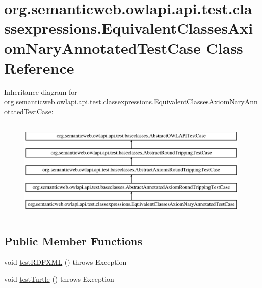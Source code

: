 \hypertarget{classorg_1_1semanticweb_1_1owlapi_1_1api_1_1test_1_1classexpressions_1_1_equivalent_classes_axiom_nary_annotated_test_case}{\section{org.\-semanticweb.\-owlapi.\-api.\-test.\-classexpressions.\-Equivalent\-Classes\-Axiom\-Nary\-Annotated\-Test\-Case Class Reference}
\label{classorg_1_1semanticweb_1_1owlapi_1_1api_1_1test_1_1classexpressions_1_1_equivalent_classes_axiom_nary_annotated_test_case}
}
Inheritance diagram for org.\-semanticweb.\-owlapi.\-api.\-test.\-classexpressions.\-Equivalent\-Classes\-Axiom\-Nary\-Annotated\-Test\-Case\-:\begin{figure}[H]
\begin{center}
\leavevmode
\includegraphics[height=4.861111cm]{classorg_1_1semanticweb_1_1owlapi_1_1api_1_1test_1_1classexpressions_1_1_equivalent_classes_axiom_nary_annotated_test_case}
\end{center}
\end{figure}
\subsection*{Public Member Functions}
\begin{DoxyCompactItemize}
\item 
void \hyperlink{classorg_1_1semanticweb_1_1owlapi_1_1api_1_1test_1_1classexpressions_1_1_equivalent_classes_axiom_nary_annotated_test_case_a8fca9eb75626ce41384815070213ce1d}{test\-R\-D\-F\-X\-M\-L} ()  throws Exception 
\item 
void \hyperlink{classorg_1_1semanticweb_1_1owlapi_1_1api_1_1test_1_1classexpressions_1_1_equivalent_classes_axiom_nary_annotated_test_case_ae193abcaee518914682661f004a92f88}{test\-Turtle} ()  throws Exception 
\end{DoxyCompactItemize}

